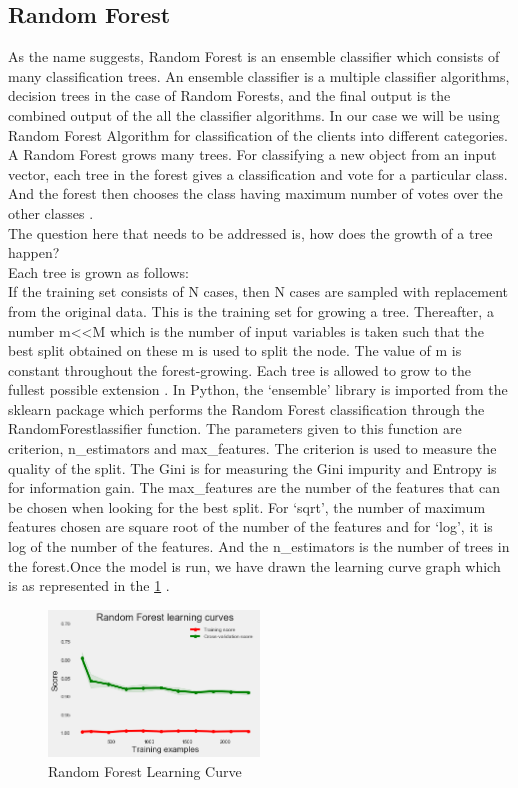 \subsection{Random Forest} 
As the name suggests, Random Forest is an ensemble classifier which consists of many classification trees. An ensemble classifier is a multiple classifier algorithms, decision trees in the case of Random Forests, and the final output is the combined output of the all the classifier algorithms. In our case we will be using Random Forest Algorithm for classification of the clients into different categories. A Random Forest grows many trees. For classifying a new object from an input vector, each tree in the forest gives a classification and vote for a particular class. And the forest then chooses the class having maximum number of votes over the other classes \cite{link13}.\\
The question here that needs to be addressed is, how does the growth of a tree happen?\\
Each tree is grown as follows:\\
If the training set consists of N cases, then N cases are sampled with replacement from the original data. This is the training set for growing a tree. Thereafter, a number m<<M which is the number of input variables is taken such that the best split obtained on these m is used to split the node. The value of m is constant throughout the forest-growing. Each tree is allowed to grow to the fullest possible extension \cite{link13}.
In Python, the `ensemble' library is imported from the sklearn package which performs the Random Forest classification through the RandomForestlassifier function. The parameters given to this function are criterion, n\_estimators and max\_features. The criterion is used to measure the quality of the split. The Gini is for measuring the Gini impurity and Entropy is for information gain. The max\_features are the number of the features that can be chosen when looking for the best split. For `sqrt', the number of maximum features chosen are square root of the number of the features and for `log', it is log of the number of the features. And the n\_estimators is the number of trees in the forest.Once the model is run, we have drawn the learning curve graph which is as represented in the \ref{5.3} .

\begin{figure}[H]
\caption{Random Forest Learning Curve}
\label{5.3}
\centering
\includegraphics[width=0.5\textwidth]{images/5_3.png}
\end{figure}

